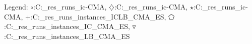 Legend: {\color{CornflowerBlue}$\circ$}:C:\Users\tristan\Documents\ppsn\BBOB\raw\_res\remaining\_runs\new\_ic\exdata\ICLB-CMA, {\color{Orange}$\diamondsuit$}:C:\Users\tristan\Documents\ppsn\BBOB\raw\_res\remaining\_runs\new\_ic\exdata\IC-CMA, {\color{Green}$\star$}:C:\Users\tristan\Documents\ppsn\BBOB\raw\_res\remaining\_runs\new\_ic\exdata\LB-CMA, {\color{red}+}:C:\Users\tristan\Documents\ppsn\BBOB\raw\_res\remaining\_runs\all\_instances\exdata\old\_ICLB\_CMA\_ES, {\color{magenta}$\pentagon$}:C:\Users\tristan\Documents\ppsn\BBOB\raw\_res\remaining\_runs\all\_instances\exdata\old\_IC\_CMA\_ES, {\color{brown}$\triangledown$}:C:\Users\tristan\Documents\ppsn\BBOB\raw\_res\remaining\_runs\all\_instances\exdata\old\_LB\_CMA\_ES